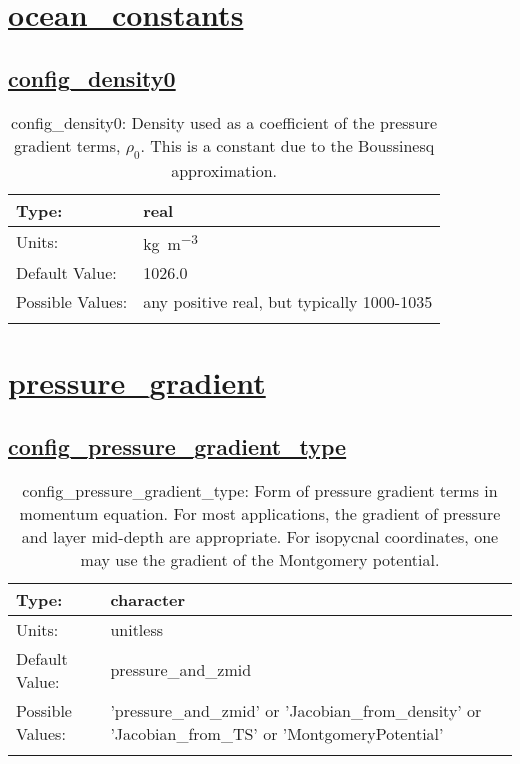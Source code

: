 \section[ocean\_constants]{\hyperref[sec:nm_tab_ocean_constants]{ocean\_constants}}
\label{sec:nm_sec_ocean_constants}
\subsection[config\_density0]{\hyperref[sec:nm_tab_ocean_constants]{config\_density0}}
\label{subsec:nm_sec_config_density0}
\begin{center}
\begin{longtable}{| p{2.0in} || p{4.0in} |}
    \hline
    Type: & real \\
    \hline
    Units: & \si{kg.m^{-3}} \\
    \hline
    Default Value: & 1026.0 \\
    \hline
    Possible Values: & any positive real, but typically 1000-1035 \\
    \hline
    \caption{config\_density0: Density used as a coefficient of the pressure gradient terms, $\rho_0$. This is a constant due to the Boussinesq approximation.}
\end{longtable}
\end{center}
\section[pressure\_gradient]{\hyperref[sec:nm_tab_pressure_gradient]{pressure\_gradient}}
\label{sec:nm_sec_pressure_gradient}
\subsection[config\_pressure\_gradient\_type]{\hyperref[sec:nm_tab_pressure_gradient]{config\_pressure\_gradient\_type}}
\label{subsec:nm_sec_config_pressure_gradient_type}
\begin{center}
\begin{longtable}{| p{2.0in} || p{4.0in} |}
    \hline
    Type: & character \\
    \hline
    Units: & \si{unitless} \\
    \hline
    Default Value: & pressure\_and\_zmid \\
    \hline
    Possible Values: & 'pressure\_and\_zmid' or 'Jacobian\_from\_density' or 'Jacobian\_from\_TS' or 'MontgomeryPotential' \\
    \hline
    \caption{config\_pressure\_gradient\_type: Form of pressure gradient terms in momentum equation. For most applications, the gradient of pressure and layer mid-depth are appropriate.  For isopycnal coordinates, one may use the gradient of the Montgomery potential.}
\end{longtable}
\end{center}
